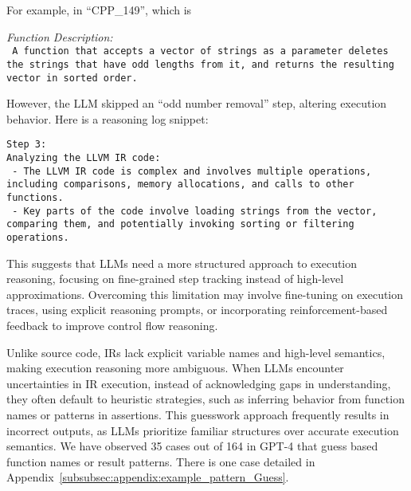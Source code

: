 For example, in ``CPP\_149'', which is
\begin{tcolorbox}[colframe=black!50, colback=gray!10, boxrule=0.5mm, arc=3mm, sharp corners, left=2mm, right=2mm, top=2mm, bottom=2mm]
\textit{Function Description:}\\
\texttt{
A function that accepts a vector of strings as a parameter
deletes the strings that have odd lengths from it,
and returns the resulting vector in sorted order.
}
\end{tcolorbox}
However, the LLM skipped an ``odd number removal'' step, altering execution behavior. Here is a reasoning log snippet:
\begin{tcolorbox}[colframe=black!50, colback=gray!10, boxrule=0.5mm, arc=3mm, sharp corners, left=2mm, right=2mm, top=2mm, bottom=2mm]
\footnotesize\texttt{Step 3:}\\
\footnotesize\texttt{Analyzing the LLVM IR code:}\\
\footnotesize\texttt{ - The LLVM IR code is complex and involves multiple operations, including comparisons, memory allocations, and calls to other functions.}\\
\footnotesize\texttt{ - Key parts of the code involve loading strings from the vector, comparing them, and potentially invoking sorting or filtering operations.}
\end{tcolorbox}
This suggests that LLMs need a more structured approach to execution reasoning, focusing on fine-grained step tracking instead of high-level approximations. Overcoming this limitation may involve fine-tuning on execution traces, using explicit reasoning prompts, or incorporating reinforcement-based feedback to improve control flow reasoning.



Unlike source code, IRs lack explicit variable names and high-level semantics, making execution reasoning more ambiguous. 
When LLMs encounter uncertainties in IR execution, instead of acknowledging gaps in understanding, they often default to heuristic strategies, such as inferring behavior from function names or patterns in assertions. This guesswork approach frequently results in incorrect outputs, as LLMs prioritize familiar structures over accurate execution semantics. We have observed 35 cases out of 164 in GPT-4 that guess based function names or result patterns. There is one case detailed in Appendix~\ref{subsubsec:appendix:example_pattern_Guess}.

